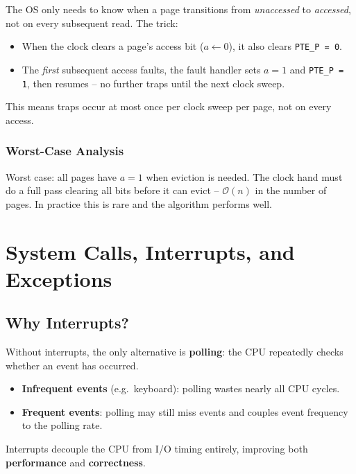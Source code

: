 \documentclass[11pt,a4paper]{article}
\newcommand{\term}[1]{\textbf{#1}}
\newcommand{\code}[1]{\texttt{#1}}
\begin{document}
The OS only needs to know when a page transitions from \emph{unaccessed} to
\emph{accessed}, not on every subsequent read.  The trick:

\begin{itemize}
  \item When the clock clears a page's access bit (\(a \leftarrow 0\)), it
        also clears \code{PTE\_P = 0}.
  \item The \emph{first} subsequent access faults, the fault handler sets
        \(a = 1\) and \code{PTE\_P = 1}, then resumes -- no further traps until
        the next clock sweep.
\end{itemize}

This means traps occur at most once per clock sweep per page, not on every
access.

\subsubsection{Worst-Case Analysis}

Worst case: all pages have \(a = 1\) when eviction is needed.  The clock hand
must do a full pass clearing all bits before it can evict -- $\mathcal{O}(n)$
in the number of pages.  In practice this is rare and the algorithm performs
well.

\section{System Calls, Interrupts, and Exceptions}

\subsection{Why Interrupts?}

Without interrupts, the only alternative is \term{polling}: the CPU repeatedly
checks whether an event has occurred.

\begin{itemize}
  \item \textbf{Infrequent events} (e.g.\ keyboard): polling wastes nearly all
        CPU cycles.
  \item \textbf{Frequent events}: polling may still miss events and couples
        event frequency to the polling rate.
\end{itemize}

Interrupts decouple the CPU from I/O timing entirely, improving both
\textbf{performance} and \textbf{correctness}.
\end{document}
